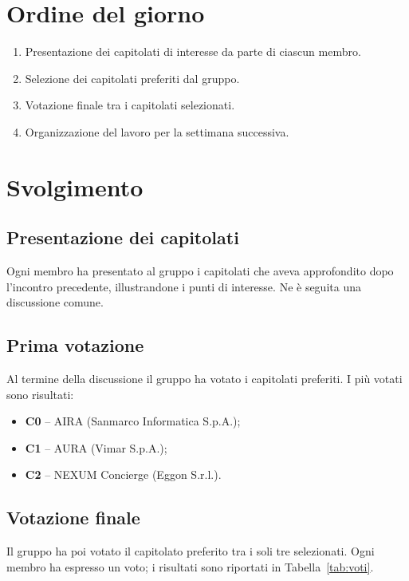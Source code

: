 \documentclass[verbale=interno]{gpt}
\begin{document}
\section{Ordine del giorno}
\begin{enumerate}
  \item Presentazione dei capitolati di interesse da parte di ciascun membro.
  \item Selezione dei capitolati preferiti dal gruppo.
  \item Votazione finale tra i capitolati selezionati.
  \item Organizzazione del lavoro per la settimana successiva.
\end{enumerate}

\section{Svolgimento}

\subsection{Presentazione dei capitolati}
Ogni membro ha presentato al gruppo i capitolati che aveva approfondito
dopo l'incontro precedente, illustrandone i punti di interesse. Ne è
seguita una discussione comune.

\subsection{Prima votazione}
Al termine della discussione il gruppo ha votato i capitolati preferiti.
I più votati sono risultati:
\begin{itemize}
  \item \textbf{C0} -- AIRA (Sanmarco Informatica S.p.A.);
  \item \textbf{C1} -- AURA (Vimar S.p.A.);
  \item \textbf{C2} -- NEXUM Concierge (Eggon S.r.l.).
\end{itemize}

\subsection{Votazione finale}
Il gruppo ha poi votato il capitolato preferito tra i soli tre
selezionati. Ogni membro ha espresso un voto; i risultati sono riportati
in Tabella~\ref{tab:voti}.
\end{document}
